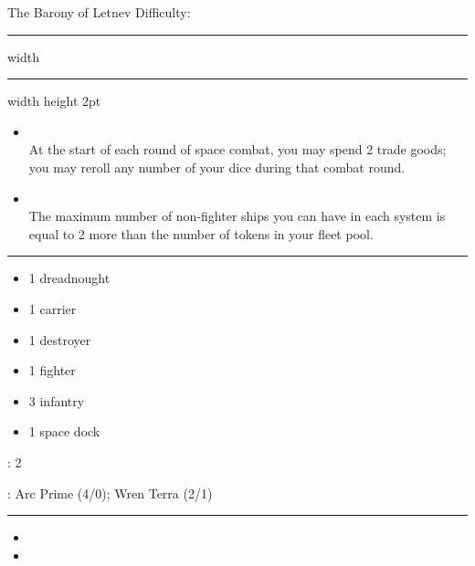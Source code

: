 \newpage
{\handel \Huge The Barony of Letnev} \hfill {\Large Difficulty: \easy} \vspace{-4pt}\\
\hrule width \hsize \kern 1mm \hrule width \hsize height 2pt


\begin{multicols}{2}


\begin{itemize}
\item {}\\
At the start of each round of space combat, you may spend 2 trade goods; you may reroll any number of your dice during that combat round.
\item {}\\
The maximum number of non-fighter ships you can have in each system is equal to 2 more than the number of tokens in your fleet pool.
\end{itemize}


\vspace{-10pt}\rule{\hsize}{0.4pt}\vspace{5pt}


\vspace{-5pt}
\begin{multicols}{2}
\begin{itemize}
\item 1 dreadnought
\item 1 carrier
\item 1 destroyer
\item 1 fighter
\item 3 infantry
\item 1 space dock
\end{itemize}
\end{multicols}

\vspace{-5pt}
: 2

\vspace{2pt}
: Arc Prime (4/0); Wren Terra (2/1)

\rule{\hsize}{0.4pt}\vspace{5pt}


\begin{itemize}
\item \antimass
\item \plasma
\end{itemize}


\end{multicols}
